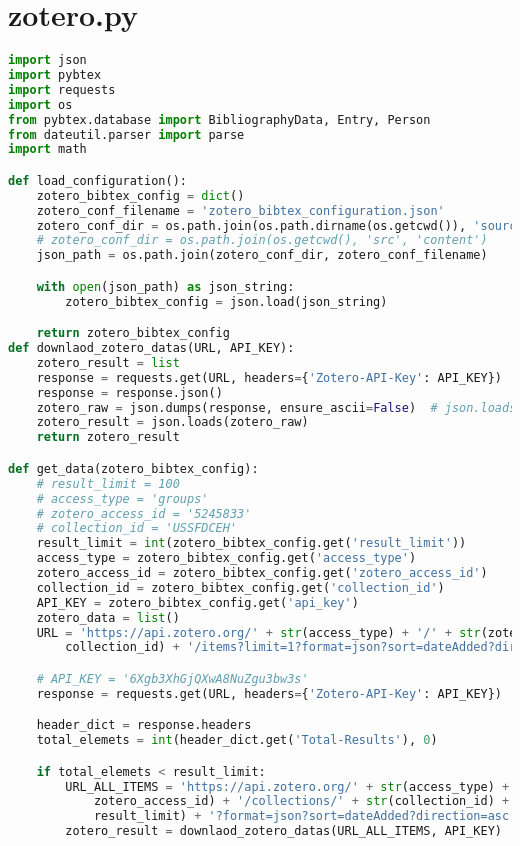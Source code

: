 
\section{zotero.py}
\begin{lstlisting}[language=python, caption=Python LaTex - zotero - Zotero BibLaTex Importer,captionpos=b,label={lst:zotero},breaklines=true]
import json
import pybtex
import requests
import os
from pybtex.database import BibliographyData, Entry, Person
from dateutil.parser import parse
import math

def load_configuration():
    zotero_bibtex_config = dict()
    zotero_conf_filename = 'zotero_bibtex_configuration.json'
    zotero_conf_dir = os.path.join(os.path.dirname(os.getcwd()), 'source', 'configuration')
    # zotero_conf_dir = os.path.join(os.getcwd(), 'src', 'content')
    json_path = os.path.join(zotero_conf_dir, zotero_conf_filename)

    with open(json_path) as json_string:
        zotero_bibtex_config = json.load(json_string)

    return zotero_bibtex_config
def downlaod_zotero_datas(URL, API_KEY):
    zotero_result = list
    response = requests.get(URL, headers={'Zotero-API-Key': API_KEY})
    response = response.json()
    zotero_raw = json.dumps(response, ensure_ascii=False)  # json.loads(response)
    zotero_result = json.loads(zotero_raw)
    return zotero_result

def get_data(zotero_bibtex_config):
    # result_limit = 100
    # access_type = 'groups'
    # zotero_access_id = '5245833'
    # collection_id = 'USSFDCEH'
    result_limit = int(zotero_bibtex_config.get('result_limit'))
    access_type = zotero_bibtex_config.get('access_type')
    zotero_access_id = zotero_bibtex_config.get('zotero_access_id')
    collection_id = zotero_bibtex_config.get('collection_id')
    API_KEY = zotero_bibtex_config.get('api_key')
    zotero_data = list()
    URL = 'https://api.zotero.org/' + str(access_type) + '/' + str(zotero_access_id) + '/collections/' + str(
        collection_id) + '/items?limit=1?format=json?sort=dateAdded?direction=asc'

    # API_KEY = '6Xgb3XhGjQXwA8NuZgu3bw3s'
    response = requests.get(URL, headers={'Zotero-API-Key': API_KEY})

    header_dict = response.headers
    total_elemets = int(header_dict.get('Total-Results'), 0)

    if total_elemets < result_limit:
        URL_ALL_ITEMS = 'https://api.zotero.org/' + str(access_type) + '/' + str(
            zotero_access_id) + '/collections/' + str(collection_id) + '/items?limit=' + str(
            result_limit) + '?format=json?sort=dateAdded?direction=asc'
        zotero_result = downlaod_zotero_datas(URL_ALL_ITEMS, API_KEY)


\end{lstlisting}
